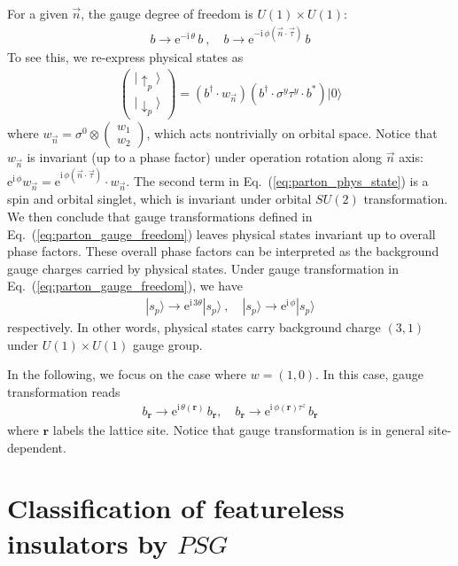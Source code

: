 \documentclass[%
 reprint,
 amsmath,amssymb,
 aps,
 pra, %
]{revtex4-1}
\newcommand{\ee}{\mathrm{e}}
\newcommand{\ii}{\mathrm{i}\,}
\newcommand{\dg}{\dagger}
\begin{document}
For a given $\vec{n}$, the gauge degree of freedom is $U(1)\times U(1)$:
\begin{align}
  b\rightarrow \ee^{-\ii\theta}\,b~,\quad b\rightarrow\ee^{-\ii\phi(\vec{n}\cdot\vec{\tau})}\,b
  \label{eq:parton_gauge_freedom}
\end{align}
To see this, we re-express physical states as
\begin{align}
  \begin{pmatrix} |\uparrow_p\rangle\\[0.2cm]|\downarrow_p\rangle\end{pmatrix}=
  (b^\dg\cdot w_{\vec{n}})(b^\dg\cdot \sigma^y\tau^y \cdot b^*) |0\rangle
  \label{eq:parton_phys_state}
\end{align}
where $w_{\vec{n}}=\sigma^0\otimes\begin{pmatrix}w_1\\w_2\end{pmatrix}$, which acts nontrivially on orbital space. 
Notice that $w_{\vec{n}}$ is invariant (up to a phase factor) under operation rotation along $\vec{n}$ axis: $\ee^{\ii\phi}w_{\vec{n}}=\ee^{\ii\phi(\vec{n}\cdot\vec{\tau})}\cdot w_{\vec{n}}$.
The second term in Eq.~(\ref{eq:parton_phys_state}) is a spin and orbital singlet, which is invariant under orbital $SU(2)$ transformation.
We then conclude that gauge transformations defined in Eq.~(\ref{eq:parton_gauge_freedom}) leaves physical states invariant up to overall phase factors. 
These overall phase factors can be interpreted as the background gauge charges carried by physical states.
Under gauge transformation in Eq.~(\ref{eq:parton_gauge_freedom}), we have
\begin{align}
  |s_p\rangle\rightarrow\ee^{\ii 3\theta}|s_p\rangle~,\quad |s_p\rangle\rightarrow\ee^{\ii \phi}|s_p\rangle
  \label{}
\end{align}
respectively.
In other words, physical states carry background charge $(3,1)$ under $U(1)\times U(1)$ gauge group.

In the following, we focus on the case where $w=(1,0)$. 
In this case, gauge transformation reads
\begin{align}
  b_{\boldsymbol{r}}\rightarrow \ee^{\ii\theta(\boldsymbol{r})}\,b_{\boldsymbol{r}},\quad b_{\boldsymbol{r}}\rightarrow\ee^{\ii\phi(\boldsymbol{r})\tau^z}\,b_{\boldsymbol{r}}
  \label{}
\end{align}
where $\boldsymbol{r}$ labels the lattice site.
Notice that gauge transformation is in general site-dependent.


\section{Classification of featureless insulators by $PSG$}
\end{document}
